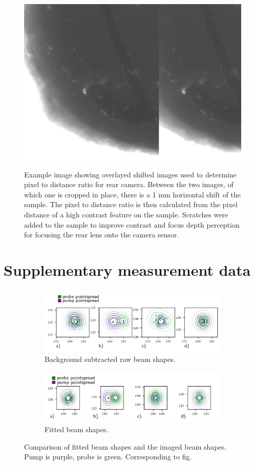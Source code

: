 \documentclass[twoside,openright]{scrreprt}
\begin{document}
{\begin{figure}[hbtp]
\centering
\includegraphics[width=0.5\linewidth]{images/TAM/BackFocus9.85mm-1mmHorizontalDiscplacement.png}
\caption{Example image showing overlayed shifted images used to determine pixel to distance ratio for rear camera. Between the two images, of which one is cropped in place, there is a 1 mm horizontal shift of the sample. The pixel to distance ratio is then calculated from the pixel distance of a high contrast feature on the sample. Scratches were added to the sample to improve contrast and focus depth perception for focusing the rear lens onto the camera sensor.\label{fig:micrometerToPxExample}}
\end{figure}

\section*{Supplementary measurement data}

\begin{figure}[hbp]
\centering
\begin{subfigure}[t]{\linewidth}
\centering
\includegraphics[scale=1]{images/CompensationTestRaw.png}
\caption{Background subtracted raw beam shapes.}
\end{subfigure}
\begin{subfigure}[t]{\linewidth}
\centering
\includegraphics[scale=1]{images/CompensationTestFitted.png}
\caption{Fitted beam shapes.}
\end{subfigure}
\caption{Comparison of fitted beam shapes and the imaged beam shapes. Pump is purple, probe is green. Corresponding to fig. \label{fig:rawVsFittedBeam}}
\end{figure}

}
\end{document}
